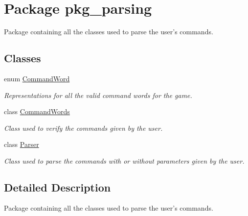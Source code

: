 \hypertarget{namespacepkg__parsing}{\section{Package pkg\-\_\-parsing}
\label{namespacepkg__parsing}
}


Package containing all the classes used to parse the user's commands.  


\subsection*{Classes}
\begin{DoxyCompactItemize}
\item 
enum \hyperlink{enumpkg__parsing_1_1CommandWord}{Command\-Word}
\begin{DoxyCompactList}\small\item\em Representations for all the valid command words for the game. \end{DoxyCompactList}\item 
class \hyperlink{classpkg__parsing_1_1CommandWords}{Command\-Words}
\begin{DoxyCompactList}\small\item\em Class used to verify the commands given by the user. \end{DoxyCompactList}\item 
class \hyperlink{classpkg__parsing_1_1Parser}{Parser}
\begin{DoxyCompactList}\small\item\em Class used to parse the commands with or without parameters given by the user. \end{DoxyCompactList}\end{DoxyCompactItemize}


\subsection{Detailed Description}
Package containing all the classes used to parse the user's commands. 